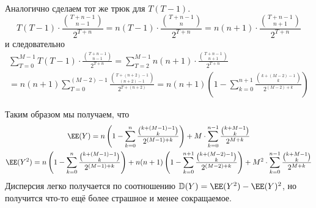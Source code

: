 \documentclass[12pt,a4paper]{article}
\newcommand{\DD}{\ensuremath{\mathbb{D}}\xspace}
\begin{document}
\begin{enumproblem}
        Аналогично сделаем тот же трюк для $T(T-1)$.
        \[
            T(T-1) \cdot \frac{\binom{T+n-1}{n-1}}{2^{T+n}}
            = n(T-1) \cdot \frac{\binom{T+n-1}{n}}{2^{T+n}}
            = n(n+1) \cdot \frac{\binom{T+n-1}{n+1}}{2^{T+n}}
        \]
        и следовательно
        \begin{multline*}
            \sum_{T=0}^{M-1} T(T-1) \cdot \frac{\binom{T+n-1}{n-1}}{2^{T+n}}
            = \sum_{T=2}^{M-1} n(n+1) \cdot \frac{\binom{T+n-1}{n+1}}{2^{T+n}}\\
            = n(n+1)\sum_{T=0}^{(M-2)-1} \frac{\binom{T+(n+2)-1}{(n+2)-1}}{2^{T+(n+2)}}
            = n(n+1)\left(1 - \sum_{k=0}^{n+1} \frac{\binom{k+(M-2)-1}{k}}{2^{(M-2)+k}}\right)
        \end{multline*}

        Таким образом мы получаем, что
        \begin{gather*}
            \EE(Y) = n\left(1 - \sum_{k=0}^{n} \frac{\binom{k+(M-1)-1}{k}}{2^{(M-1)+k}}\right) + M \cdot \sum_{k=0}^{n-1} \frac{\binom{k+M-1}{k}}{2^{M+k}}\\
            \EE(Y^2) = n\left(1 - \sum_{k=0}^{n} \frac{\binom{k+(M-1)-1}{k}}{2^{(M-1)+k}}\right) + n(n+1)\left(1 - \sum_{k=0}^{n+1} \frac{\binom{k+(M-2)-1}{k}}{2^{(M-2)+k}}\right) + M^2 \cdot \sum_{k=0}^{n-1} \frac{\binom{k+M-1}{k}}{2^{M+k}}
        \end{gather*}
        Дисперсия легко получается по соотношению $\DD(Y) = \EE(Y^2) - \EE(Y)^2$, но получится что-то ещё более страшное и менее сокращаемое.


\end{enumproblem}
\end{document}
